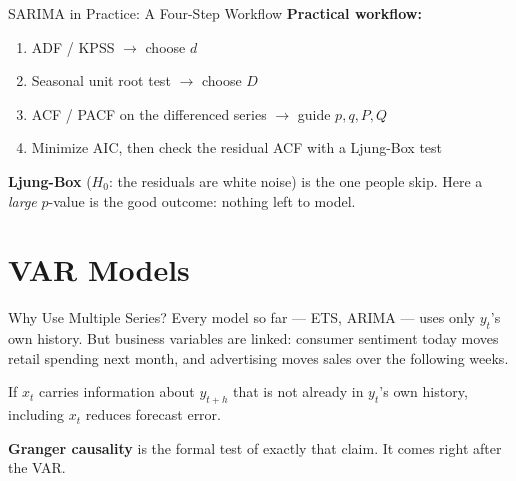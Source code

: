 \documentclass[aspectratio=169, 11pt]{beamer}
\begin{document}
\begin{frame}{SARIMA in Practice: A Four-Step Workflow}
  \textbf{Practical workflow:}
  \begin{enumerate}\itemsep4pt
    \item ADF / KPSS $\to$ choose $d$
    \item Seasonal unit root test $\to$ choose $D$
    \item ACF / PACF on the differenced series $\to$ guide $p, q, P, Q$
    \item Minimize AIC, then check the residual ACF with a Ljung-Box test
  \end{enumerate}
  \vspace{0.3cm}
  \textbf{Ljung-Box} ($H_0$: the residuals are white noise) is the one people skip. Here a
  \emph{large} $p$-value is the good outcome: nothing left to model.

  \vspace{0.2cm}
\end{frame}

\section{VAR Models}


\begin{frame}{Why Use Multiple Series?}
  Every model so far --- ETS, ARIMA --- uses only $y_t$'s own history. But business
  variables are linked: consumer sentiment today moves retail spending next month, and
  advertising moves sales over the following weeks.
  \begin{keybox}
    If $x_t$ carries information about $y_{t+h}$ that is not already in $y_t$'s own history,
    including $x_t$ reduces forecast error.
  \end{keybox}
  \textbf{Granger causality} \parencite{Granger1969} is the formal test of exactly that
  claim. It comes right after the VAR.
\end{frame}
\end{document}
